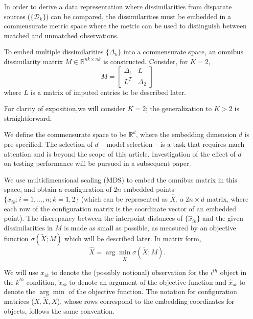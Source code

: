 \documentclass[12pt]{article} %
\newenvironment{remark}[1][Remark]{\begin{trivlist}
\item[\hskip \labelsep {\bfseries #1}]}{\end{trivlist}}
\begin{document}
  In order to derive a data representation where dissimilarities from disparate sources ($\{\mathcal{D}_k\}$)  can be compared, the dissimilarities must be embedded in a commensurate metric space where the metric can be used to distinguish between matched and unmatched observations.


To embed multiple dissimilarities  $\{\Delta_k\}$  into a commensurate space, an omnibus dissimilarity matrix  $M \in \mathbb{R}^{nk \times nk}$  is constructed. Consider, for $K=2$,
 \begin{equation}
M=  \left[ \begin{array}{cc}
         \Delta_1 & L\\
        L^T  & \Delta_2 
     \end{array}  \right]     \label{omnibus} 
\end{equation} where $L$ is a matrix of imputed entries to be described later. 

\begin{remark}
For clarity of exposition,we will consider $K=2$; the generalization to $K>2$ is straightforward. 
\end{remark}

We define the commensurate space to be  $\mathbb{R}^d$, where the embedding dimension $d$ is pre-specified. The selection of $d$ -- model selection -- is  a task that requires much attention and is  beyond the scope of this article. Investigation of the effect of $d$ on testing performance will be pursued in a  subsequent paper.

 We use multidimensional scaling (MDS) \cite{borg+groenen:1997} to embed  the omnibus matrix in this  space, and obtain  a configuration of $2n$ embedded points $\{\hat{x}_{ik}; i=1,\ldots,n;k=1,2\}$ (which can be represented as $\hat{X}$, a $2n \times d$ matrix, where each row of the configuration matrix is the coordinate vector of an embedded point). The discrepancy between the interpoint distances of $\{\hat{x}_{ik}\}$ and the given dissimilarities in  $M$ is made as small  as possible, as measured by an objective function $\sigma(\widetilde{X};M)$ which will be described later. In matrix form, $$ \hat{X}=\arg \min_{\widetilde{X}} \sigma(\widetilde{X};M).$$ 

\begin{remark} 
We will use $x_{ik}$ to denote the (possibly notional)  observation  for the $i^{th}$ object in the $k^{th}$ condition, $\tilde{x}_{ik}$ to denote an argument of the objective function  and  $\hat{x}_{ik}$  to denote the $\arg\min$  of the objective function. The notation for configuration matrices ($X,\widetilde{X},\hat{X}$), whose  rows  correspond to  the embedding coordinates for objects, follows the  same convention.
\end{remark}
\end{document}
